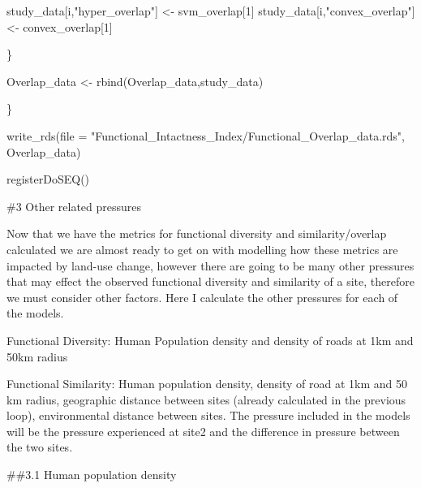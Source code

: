 \documentclass[
]{article}
\newenvironment{Shaded}{\begin{snugshade}}{\end{snugshade}}
\newcommand{\AttributeTok}[1]{\textcolor[rgb]{0.77,0.63,0.00}{#1}}
\newcommand{\DecValTok}[1]{\textcolor[rgb]{0.00,0.00,0.81}{#1}}
\newcommand{\FunctionTok}[1]{\textcolor[rgb]{0.00,0.00,0.00}{#1}}
\newcommand{\NormalTok}[1]{#1}
\newcommand{\OtherTok}[1]{\textcolor[rgb]{0.56,0.35,0.01}{#1}}
\newcommand{\StringTok}[1]{\textcolor[rgb]{0.31,0.60,0.02}{#1}}
\begin{document}
\begin{Shaded}
\begin{Highlighting}[]
\NormalTok{      study\_data[i,}\StringTok{"hyper\_overlap"}\NormalTok{] }\OtherTok{\textless{}{-}}\NormalTok{ svm\_overlap[}\DecValTok{1}\NormalTok{]}
\NormalTok{      study\_data[i,}\StringTok{"convex\_overlap"}\NormalTok{] }\OtherTok{\textless{}{-}}\NormalTok{ convex\_overlap[}\DecValTok{1}\NormalTok{]}

\NormalTok{    \}}

\NormalTok{  Overlap\_data }\OtherTok{\textless{}{-}} \FunctionTok{rbind}\NormalTok{(Overlap\_data,study\_data)}
  

\NormalTok{        \}}


\FunctionTok{write\_rds}\NormalTok{(}\AttributeTok{file =} \StringTok{"Functional\_Intactness\_Index/Functional\_Overlap\_data.rds"}\NormalTok{, Overlap\_data)}


\FunctionTok{registerDoSEQ}\NormalTok{()}
\end{Highlighting}
\end{Shaded}

\#3 Other related pressures

Now that we have the metrics for functional diversity and
similarity/overlap calculated we are almost ready to get on with
modelling how these metrics are impacted by land-use change, however
there are going to be many other pressures that may effect the observed
functional diversity and similarity of a site, therefore we must
consider other factors. Here I calculate the other pressures for each of
the models.

Functional Diversity: Human Population density and density of roads at
1km and 50km radius

Functional Similarity: Human population density, density of road at 1km
and 50 km radius, geographic distance between sites (already calculated
in the previous loop), environmental distance between sites. The
pressure included in the models will be the pressure experienced at
site2 and the difference in pressure between the two sites.

\#\#3.1 Human population density
\end{document}
